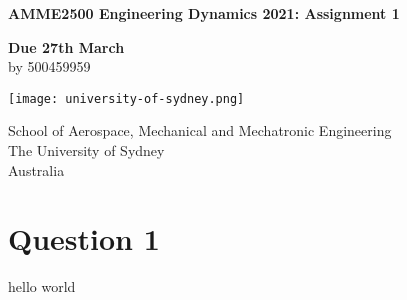 \documentclass[11]{article}
\begin{document}
\begin{titlepage}
    \begin{center}
        \vspace*{1cm}
            
        \Huge
        \textbf{AMME2500 Engineering Dynamics 2021: Assignment 1}
            
        \vspace{0.5cm}
        \LARGE
        \textbf{Due 27th March} \\
        by 500459959
            
        \vspace{1.5cm}
        
        \large
        \vspace{1cm}
            
        \vfill
            
        \vspace{0.4cm}
            
        \texttt{[image: university-of-sydney.png]}
            
        \Large
        School of Aerospace, Mechanical and Mechatronic Engineering\\
        The University of Sydney\\
        Australia\\
       
        \newpage
        \tableofcontents %
    \end{center}
\end{titlepage}

\newpage
\large
{}
\section{Question 1}
hello world
\end{document}
